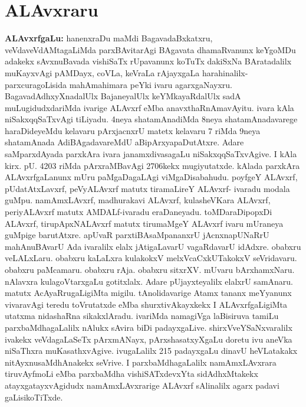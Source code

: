 \chapter{ALAvxraru}\label{chap008}

{\textbf{ALAvxrfgaLu:}} hanenxraDu maMdi BagavadaBxkatxru, veVdaveVdAMtagaLiMda parxBAvitarAgi BAgavata dhamaRvanunx keYgoMDu adakekx sAvxnuBavada vishiSaTx rUpavanunx koTuTx dakiSxNa BAratadalilx  muKayxvAgi pAMDayx, coVLa, keVraLa rAjayxgaLa harahinalilx-parxcuragoLisida mahAmahimara peYki ivaru agarxgaNayxru. BagavadAdhxyXnadalUlx BajaneyalUlx keYMkayaRdalUlx sadA muLugidudxdariMda ivarige ALAvxrf eMba anavxthaRnAmavAyitu. ivara kAla niSakxqqSaTxvAgi tiLiyadu. {\rm4}neya shatamAnadiMda {\rm8}neya shatamAnadavarege haraDideyeMdu kelavaru pArxjacnxrU matetx kelavaru {\rm 7} riMda {\rm 9}neya shatamAnada AdiBAgadavareMdU aBipArxyapaDutAtxre. Adare saMparxdAyada parxkAra ivara janamxdivasagaLu niSakxqqSaTxvAgive. I kAla kirx. pU. {\rm 4203} riMda pArxraMBavAgi {\rm 2706}kekx mugiyutatxde. kAlada parxkAra ALAvxrfgaLanunx mUru paMgaDagaLAgi viMgaDisabahudu. poyfgeY ALAvxrf, pUdatAtxLavxrf, peVyALAvxrf matutx tiramaLireY ALAvxrf- ivaradu modala guMpu. namAmxLAvxrf, madhurakavi ALAvxrf, kulasheVKara ALAvxrf, periyALAvxrf matutx AMDALf-ivaradu eraDaneyadu. toMDaraDipopxDi ALAvxrf, tirupApxNALAvxrf matutx tirumaMgeY ALAvxrf ivaru mUraneya guMpige barutAtxre. apUvaR parxtiBAsaMpananxrU jAcnxnapUNaRrU mahAnuBAvarU Ada ivaralilx elalx jAtigaLavarU vagaRdavarU idAdxre. obabxru veLALxLaru. obabxru kaLaLxra kulakokxV melxVcaCxkUTakokxV seVridavaru. obabxru paMcamaru. obabxru rAja. obabxru sitxrXV. mUvaru bArxhamxNaru. nAlavxra kulagoVtarxgaLu gotitxlalx. Adare pUjayxteyalilx elalxrU samAnaru. matutx AcAyaRrugaLigiMta migilu. tAnolidavarige Atamx tananx meYyanunx vivaravAgi teredu toVrutatxde eMba shurxtivAkayxkekx I ALAvxrfgaLigiMta utatxma nidashaRna sikakxlAradu. ivariMda namagiVga laBisiruva tamiLu parxbaMdhagaLalilx nAlukx sAvira biDi padayxgaLive. shirxVveYSaNxvaralilx ivakekx veVdagaLaSeTx pArxmANayx, pArxshasatxyXgaLu doretu ivu aneVka niSaThxra muKasathxvAgive. ivugaLalilx {\rm 215} padayxgaLu dinavU heVLatakakx nitAyxnusaMdhAnakekx seVrive. I parxbaMdhagaLalilx namAmxLAvxrara tiruvAyfmoLi eMba parxbaMdha vishiSATxdevxYta sidAdhxMtakekx atayxgatayxvAgidudx namAmxLAvxrarige ALAvxrf sAlinalilx agarx padavi gaLisikoTiTxde.

